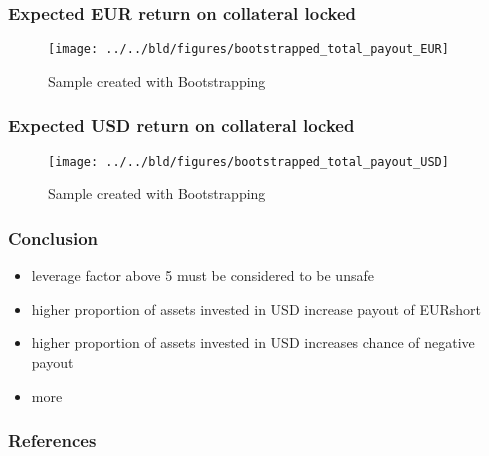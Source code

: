 \documentclass[11pt]{beamer}
\begin{document}
\begin{frame}[t]
    \frametitle{Expected EUR return on collateral locked}
    \begin{figure}
        \caption{Sample created with Bootstrapping}
        \texttt{[image: ../../bld/figures/bootstrapped\_total\_payout\_EUR]}
    \end{figure}
\end{frame}

\begin{frame}[t]
    \frametitle{Expected USD return on collateral locked}
    \begin{figure}
        \caption{Sample created with Bootstrapping}
        \texttt{[image: ../../bld/figures/bootstrapped\_total\_payout\_USD]}
    \end{figure}
\end{frame}

\begin{frame}[t]
    \frametitle{Conclusion}
    \begin{itemize}
        \item leverage factor above 5 must be considered to be unsafe
        \item higher proportion of assets invested in USD increase payout of EURshort
        \item higher proportion of assets invested in USD increases chance of negative payout
        \item more 
    \end{itemize}

    \note{~}
\end{frame}

 {
    \begin{frame}
        \frametitle{}
    \end{frame}

}

\begin{frame}[allowframebreaks]
    \frametitle{References}

    \renewcommand{\bibfont}{\normalfont\footnotesize}
    \printbibliography

\end{frame}
\end{document}
